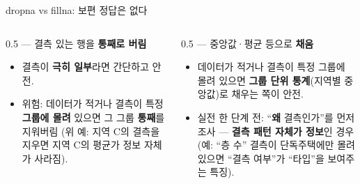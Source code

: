 \documentclass[aspectratio=169,11pt]{beamer}
\begin{document}
\begin{frame}{dropna vs fillna: 보편 정답은 없다}
  \begin{columns}[T]
    \begin{column}{0.5\textwidth}
       --- 결측 있는 행을 \textbf{통째로 버림}
      \begin{itemize}
        \item 결측이 \textbf{극히 일부}라면 간단하고 안전.
        \item 위험: 데이터가 적거나 결측이 특정 \textbf{그룹에
          몰려} 있으면 그 그룹 \textbf{통째}를 지워버림
          (위 예: 지역 C의 결측을 지우면 지역 C의 평균가
          정보 자체가 사라짐).
      \end{itemize}
    \end{column}
    \begin{column}{0.5\textwidth}
       --- 중앙값·평균 등으로 \textbf{채움}
      \begin{itemize}
        \item 데이터가 적거나 결측이 특정 그룹에 몰려 있으면
          \textbf{그룹 단위 통계}(지역별 중앙값)로 채우는 쪽이
          안전.
        \item 실전 한 단계 전: ``\textbf{왜} 결측인가''를 먼저
          조사 --- \textbf{결측 패턴 자체가 정보}인 경우 (예:
          ``층 수'' 결측이 단독주택에만 몰려 있으면 ``결측
          여부''가 ``타입''을 보여주는 특징).
      \end{itemize}
    \end{column}
  \end{columns}
\end{frame}

\end{document}

